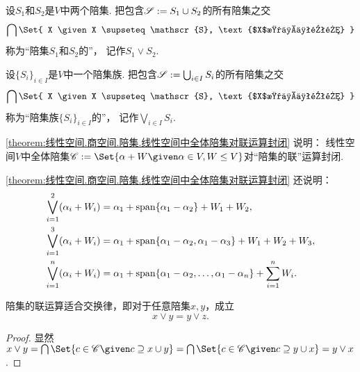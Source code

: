 \begin{definition}
设\(S_1\)和\(S_2\)是\(V\)中两个陪集.
把包含\(\mathscr{S} := S_1 \cup S_2\)的所有陪集之交\begin{equation*}
	\bigcap\Set{
		X
		\given
		X \supseteq \mathscr{S},
		\text{$X$是一个陪集}
	}
\end{equation*}
称为“陪集\(S_1\)和\(S_2\)的”，
记作\(S_1 \vee S_2\).
\end{definition}

\begin{definition}
设\(\{S_i\}_{i \in I}\)是\(V\)中一个陪集族.
把包含\(\mathscr{S} := \bigcup_{i \in I} S_i\)的所有陪集之交\begin{equation*}
	\bigcap\Set{
		X
		\given
		X \supseteq \mathscr{S},
		\text{$X$是一个陪集}
	}
\end{equation*}
称为“陪集族\(\{S_i\}_{i \in I}\)的”，
记作\(\bigvee_{i \in I} S_i\).
\end{definition}

\cref{theorem:线性空间.商空间.陪集.线性空间中全体陪集对联运算封闭} 说明：
线性空间\(V\)中全体陪集\(
	\mathscr{C}
	\defeq
	\Set{
		\alpha + W
		\given
		\alpha \in V,
		W \AlgebraSubstructure V
	}
\)对“陪集的联”运算封闭.

\cref{theorem:线性空间.商空间.陪集.线性空间中全体陪集对联运算封闭} 还说明：\begin{align}
	\bigvee_{i=1}^2 (\alpha_i + W_i)
	&= \alpha_1 + \operatorname{span}\{\alpha_1 - \alpha_2\} + W_1 + W_2,
		\label{equation:仿射几何.两个陪集的联}
		\\
	\bigvee_{i=1}^3 (\alpha_i + W_i)
	&= \alpha_1 + \operatorname{span}\{\alpha_1 - \alpha_2,\alpha_1 - \alpha_3\} + W_1 + W_2 + W_3,
		\\
	\bigvee_{i=1}^n (\alpha_i + W_i)
	&= \alpha_1 + \operatorname{span}\{\alpha_1 - \alpha_2,\dotsc,\alpha_1 - \alpha_n\}
		+ \sum_{i=1}^n W_i.
\end{align}

\begin{property}
陪集的联运算适合交换律，即对于任意陪集\(x,y\)，成立\begin{equation}
	x \vee y = y \vee z.
\end{equation}
\begin{proof}
显然\(
	x \vee y
	= \bigcap\Set{
		c \in \mathscr{C}
		\given
		c \supseteq x \cup y
	}
	= \bigcap\Set{
		c \in \mathscr{C}
		\given
		c \supseteq y \cup x
	}
	= y \vee x
\).
\end{proof}
\end{property}

